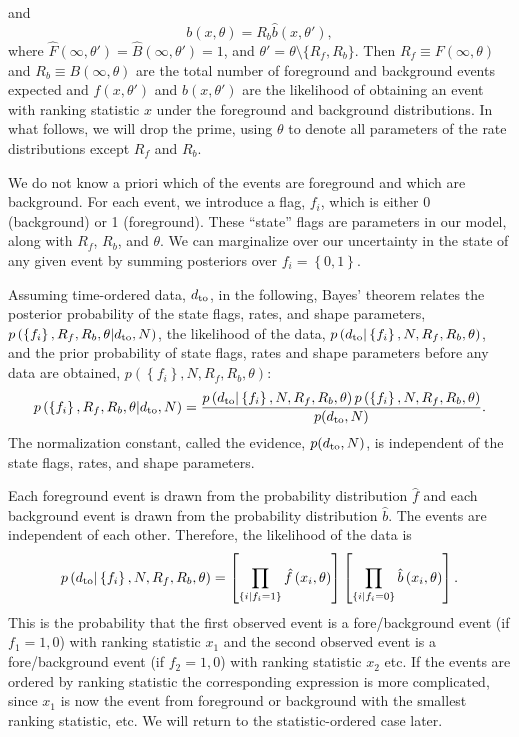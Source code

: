 \documentclass[aps,prd]{revtex4-1}
\newcommand{\mathset}[1]{\left\{ #1 \right\}}
\begin{document}
and
\begin{equation}
  b(x, \theta) = R_b \hat{b}(x, \theta'),
\end{equation}
where $\hat{F}(\infty, \theta') = \hat{B}(\infty, \theta') = 1$, and
$\theta' = \theta \setminus \{R_{f}, R_{b} \}$.  Then $R_f \equiv
F(\infty,\theta)$ and $R_b \equiv B(\infty,\theta)$ are the total
number of foreground and background events expected and $\hat{f}(x,
\theta')$ and $\hat{b}(x, \theta')$ are the likelihood of obtaining an
event with ranking statistic $x$ under the foreground and background
distributions.  In what follows, we will drop the prime, using
$\theta$ to denote all parameters of the rate distributions except
$R_f$ and $R_b$.

We do not know a priori which of the events are foreground and which
are background.  For each event, we introduce a flag, $f_i$, which is
either 0 (background) or 1 (foreground).  These ``state'' flags are
parameters in our model, along with $R_f$, $R_b$, and $\theta$.  We
can marginalize over our uncertainty in the state of any given event
by summing posteriors over $f_i = \mathset{0,1}$.

Assuming time-ordered data, $d_{\rm to}$, in the following, Bayes'
theorem relates the posterior probability of the state flags, rates,
and shape parameters, $p\left(\mathset{f_i}, R_f, R_b, \theta | d_{\rm
  to}, N \right)$, the likelihood of the data, $p\left( d_{\rm to} |
\mathset{f_i}, N, R_f, R_b, \theta\right)$, and the prior probability
of state flags, rates and shape parameters before any data are
obtained, $p\left( \mathset{f_i}, N, R_f, R_b, \theta\right)$:
\begin{equation}
  \label{eq:Bayes}
  p\left(\mathset{f_i}, R_f, R_b, \theta | d_{\rm to}, N \right) =
  \frac{p\left( d_{\rm to} | \mathset{f_i}, N, R_f, R_b, \theta\right)
    p\left(\mathset{f_i}, N, R_f, R_b, \theta\right)}{p(d_{\rm to},
    N)}.
\end{equation}
The normalization constant, called the evidence, $p(d_{\rm to}, N)$,
is independent of the state flags, rates, and shape parameters.

Each foreground event is drawn from the probability distribution
$\hat{f}$ and each background event is drawn from the probability
distribution $\hat{b}$.  The events are independent of each other.
Therefore, the likelihood of the data is
\begin{equation}
  p\left( d_{\rm to} | \mathset{f_i}, N, R_f, R_b, \theta\right) =
  \left[ \prod_{\mathset{i | f_i = 1}} \hat{f}\left(x_i, \theta\right)
    \right] \left[ \prod_{\mathset{i | f_i = 0}} \hat{b}\left( x_i,
    \theta\right) \right].
\end{equation}
This is the probability that the first observed event is a
fore/background event (if $f_1=1,0$) with ranking statistic $x_1$ and
the second observed event is a fore/background event (if $f_2=1,0$)
with ranking statistic $x_2$ etc. If the events are ordered by ranking
statistic the corresponding expression is more complicated, since
$x_1$ is now the event from foreground or background with the smallest
ranking statistic, etc. We will return to the statistic-ordered case
later.
\end{document}
